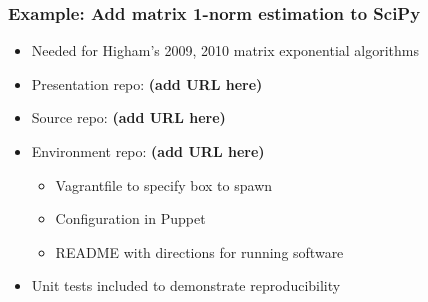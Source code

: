 \documentclass [14pt]{beamer}
\begin{document}
\begin{frame}
\frametitle{Example: Add matrix 1-norm estimation to SciPy}
\begin{itemize}
\item Needed for Higham's 2009, 2010 matrix exponential algorithms
\item Presentation repo: \textbf{(add URL here)}
\item Source repo: \textbf{(add URL here)}
\item Environment repo: \textbf{(add URL here)}
\begin{itemize}
\item Vagrantfile to specify box to spawn
\item Configuration in Puppet
\item README with directions for running software
\end{itemize}
\item Unit tests included to demonstrate reproducibility
\end{itemize}
\end{frame}


\end{document}
